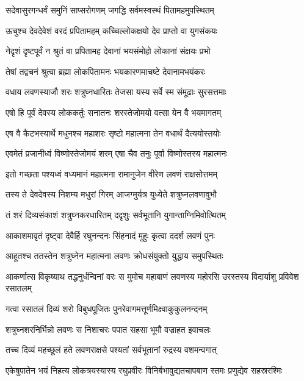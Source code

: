 \twolineshloka
{सदेवासुरगन्धर्वं समुनिं साप्सरोगणम्}
{जगद्धि सर्वमस्वस्थं पितामहमुपस्थितम्} %

\twolineshloka
{ऊचुश्च देवदेवेशं वरदं प्रपितामहम्}
{कच्चिल्लोकक्षयो देव प्राप्तो वा युगसंकयः} %

\twolineshloka
{नेदृशं दृष्टपूर्वं न श्रुतं वा प्रपितामह}
{देवानां भयसंमोहो लोकानां संक्षयः प्रभो} %

\twolineshloka
{तेषां तद्वचनं श्रुत्वा ब्रह्मा लोकपितामनः}
{भयकारणमाचष्टे देवानामभयंकरः} %

\twolineshloka
{वधाय लवणस्याजौ शरः शत्रुघ्नधारितः}
{तेजसा यस्य सर्वे स्म संमूढाः सुरसत्तमाः} %

\twolineshloka
{एषो हि पूर्वं देवस्य लोककर्तुः सनातनः}
{शरस्तेजोमयो वत्सा येन वै भयमागतम्} %

\twolineshloka
{एष वै कैटभस्यार्थे मधुनश्च महाशरः}
{सृष्टो महात्मना तेन वधार्थं दैत्ययोस्तयोः} %

\twolineshloka
{एवमेतं प्रजानीध्वं विष्णोस्तेजोमयं शरम्}
{एषा चैव तनुः पूर्वा विष्णोस्तस्य महात्मनः} %

\twolineshloka
{इतो गच्छता पश्यध्वं वध्यमानं महात्मना}
{रामानुजेन वीरेण लवणं राक्षसोत्तमम्} %

\twolineshloka
{तस्य ते देवदेवस्य निशम्य मधुरां गिरम्}
{आजग्मुर्यत्र युध्येते शत्रुघ्नलवणावुभौ} %

\twolineshloka
{तं शरं दिव्यसंकाशं शत्रुघ्नकरधारितम्}
{ददृशुः सर्वभूतानि युगान्ताग्निमिवोत्थितम्} %

\twolineshloka
{आकाशमावृतं दृष्ट्वा देवैर्हि रघुनन्दनः}
{सिंहनादं मुहुः कृत्वा ददर्श लवणं पुनः} %

\twolineshloka
{आहूतश्च ततस्तेन शत्रुघ्नेन महात्मना}
{लवणः क्रोधसंयुक्तो युद्धाय समुपस्थितः} %

\threelineshloka
{आकर्णात्स विकृष्याथ तद्धनुर्धन्विनां वरः}
{स मुमोच महाबाणं लवणस्य महोरसि}
{उरस्तस्य विदार्याशु प्रविवेश रसातलम्} %

\twolineshloka
{गत्वा रसातलं दिव्यं शरो विबुधपूजितः}
{पुनरेवागमत्तूर्णमिक्ष्वाकुकुलनन्दनम्} %

\twolineshloka
{शत्रुघ्नशरनिर्भिन्नो लवणः स निशाचरः}
{पपात सहसा भूमौ वज्राहत इवाचलः} %

\twolineshloka
{तच्च दिव्यं महच्छूलं हते लवणराक्षसे}
{पश्यतां सर्वभूतानां रुद्रस्य वशमन्वगात्} %

\fourlineindentedshloka
{एकेषुपातेन भयं निहत्य}
{ लोकत्रयस्यास्य रघुप्रवीरः}
{विनिर्बभावुद्यतचापबाण}
{स्तमः प्रणुद्येव सहस्ररश्मिः} %


